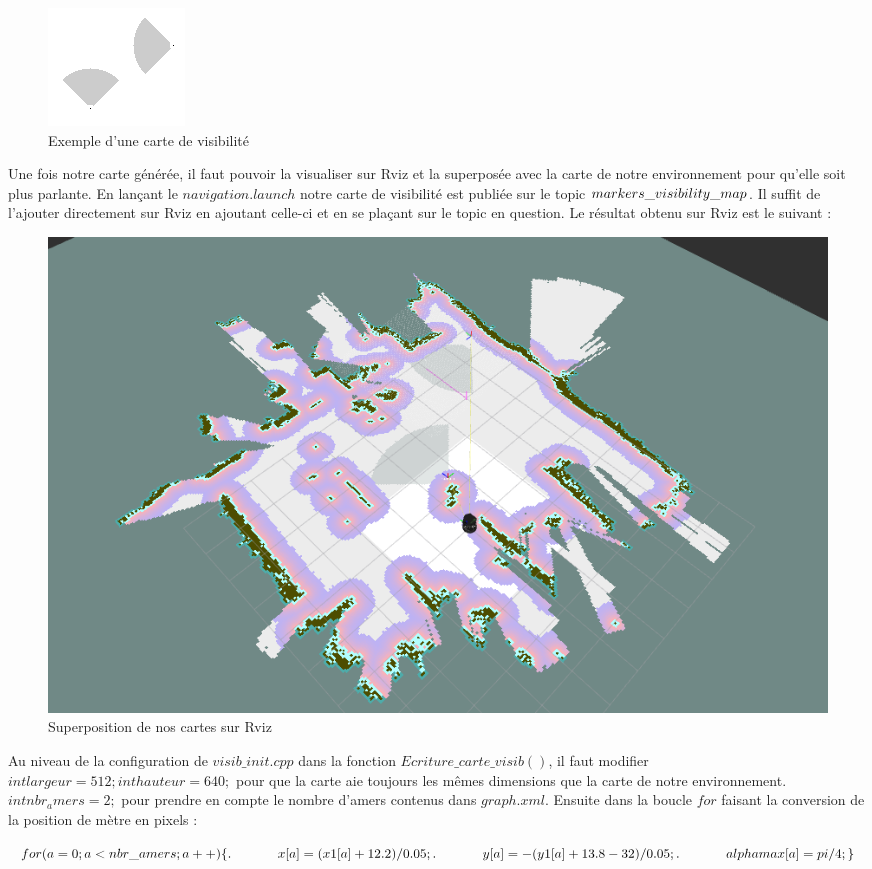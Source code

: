 \documentclass[10pt,a4paper]{article}
\begin{document}
\begin{figure}[!h]
\center
\includegraphics{figures/visib.png} 
\caption{Exemple d'une carte de visibilité}	
\end{figure}

Une fois notre carte générée, il faut pouvoir la visualiser sur Rviz et la superposée avec la carte de notre environnement pour qu'elle soit plus parlante. En lançant le $navigation.launch$ notre carte de visibilité est publiée sur le topic $\/markers\_visibility\_map$. Il suffit de l'ajouter directement sur Rviz en ajoutant celle-ci et en se plaçant sur le topic en question. Le résultat obtenu sur Rviz est le suivant :

\begin{figure}[!h]
\center
\includegraphics[scale=0.4]{figures/visib_rviz.png} 
\caption{Superposition de nos cartes sur Rviz}	
\end{figure}

Au niveau de la configuration de $visib\_init.cpp$ dans la fonction $Ecriture\_carte\_visib()$, il faut modifier $int largeur=512;	 int hauteur=640;$ pour que la carte aie toujours les mêmes dimensions que la carte de notre environnement. $int nbr_amers=2;$ pour prendre en compte le nombre d'amers contenus dans $graph.xml$. Ensuite dans la boucle $for$ faisant la conversion de la position de mètre en pixels :

$\\
for(a=0;a<nbr\_amers;a++)\\
	\{ \\
. \hspace{35pt}    x[a]=(x1[a]+12.2)/0.05;\\
. \hspace{35pt}    y[a]=-(y1[a]+13.8-32)/0.05;\\
. \hspace{35pt}    alphamax[a]=pi/4;\\
	\}\\
	$
\end{document}
